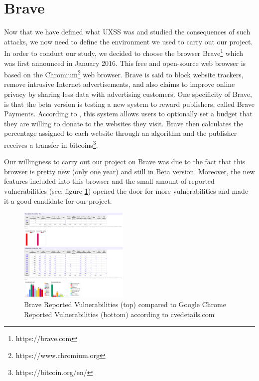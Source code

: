 \documentclass[journal]{IEEEtran}
\begin{document}
\section{Brave}

Now that we have defined what UXSS was and studied the consequences of such attacks, we now need to define the environment we used to carry out our project. \\
In order to conduct our study, we decided to choose the browser Brave\footnote{https://brave.com} which was first announced in January 2016. This free and open-source web browser is based on the Chromium\footnote{https://www.chromium.org} web browser. Brave is said to block website trackers, remove intrusive Internet advertisements, and also claims to improve online privacy by sharing less data with advertising customers. One specificity of Brave, is that the beta version is testing a new system to reward publishers, called Brave Payments. According to \cite{braveWikipedia}, this system allows users to optionally set a budget that they are willing to donate to the websites they visit. Brave then calculates the percentage assigned to each website through an algorithm and the publisher receives a transfer in bitcoins\footnote{https://bitcoin.org/en/}.

\medskip

Our willingness to carry out our project on Brave was due to the fact that this browser is pretty new (only one year) and still in Beta version. Moreover, the new features included into this browser and the small amount of reported vulnerabilities (see: figure \ref{fig:BraveReportedVulnerabilities}) opened the door for more vulnerabilities and made it a good candidate for our project.

\begin{figure}[h]
\centering
\includegraphics[width=0.47\textwidth]{images/BraveReportedVulnerabilities.png}
\caption{Brave Reported Vulnerabilities (top) compared to Google Chrome Reported Vulnerabilities (bottom) according to cvedetails.com}
\label{fig:BraveReportedVulnerabilities}
\end{figure}
\end{document}
